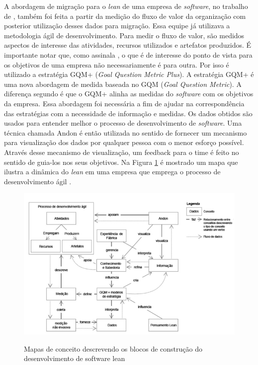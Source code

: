 A abordagem de migração para o \textit{lean} de uma empresa de \textit{software}, no trabalho de , também foi feita a partir da medição do fluxo de valor da organização com posterior utilização desses dados para migração. Essa equipe já utilizava a metodologia ágil de desenvolvimento. Para medir o fluxo de valor, são medidos aspectos de interesse das atividades, recursos utilizados e artefatos produzidos. É importante notar que, como assinala , o que é de interesse do ponto de vista para os objetivos de uma empresa não necessariamente é para outra. Por isso é utilizado a estratégia GQM+ (\textit{Goal Question Metric Plus}). A estratégia GQM+ é uma nova abordagem de medida baseada no GQM (\textit{Goal Question Metric}). A diferença segundo  é que o GQM+ alinha as medidas do \textit{software} com os objetivos da empresa. Essa abordagem foi necessária a fim de ajudar na correspondência das estratégias com a necessidade de informação e medidas. Os dados obtidos são usados para entender melhor o processo de desenvolvimento de \textit{software}. Uma técnica chamada Andon é então utilizada no sentido de fornecer um mecanismo para visualização dos dados por qualquer pessoa com o menor esforço possível. Através desse mecanismo de visualização, um feedback para o time é feito no sentido de guia-los nos seus objetivos. Na Figura \ref{fig:01} é mostrado um mapa que ilustra a dinâmica do \textit{lean} em uma empresa que emprega o processo de desenvolvimento ágil \cite{lean:14}.

\begin{figure}[hb]
\begin{center}
\caption{Mapas de conceito descrevendo os blocos de construção do desenvolvimento de software lean}
\label{fig:01}
\includegraphics[width=15cm]{assets/figura1} \\
\end{center}
\end{figure}

